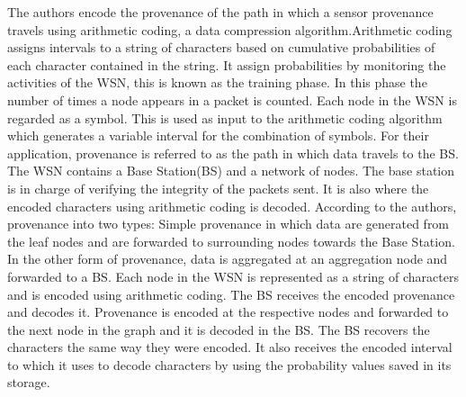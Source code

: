 The authors encode the provenance of the path in which a sensor provenance travels using arithmetic coding, a data compression algorithm.Arithmetic coding assigns intervals to a string of characters based on  cumulative probabilities of each character contained in the string. It assign probabilities by monitoring the activities of the WSN, this is known as the training phase. In this phase the number of times a node appears in a packet is counted.  Each node in the WSN is regarded as a symbol. This is used as input to the arithmetic coding algorithm which generates a variable interval for the combination of symbols. For their application, provenance is referred to as the path in which data travels to the BS. The WSN contains a Base Station(BS) and a network of nodes. The base station is in charge of verifying the integrity of the packets sent. It is also where the encoded characters using arithmetic coding is decoded.  According to the authors, provenance into two types: Simple provenance in which data are generated from the leaf nodes and are forwarded to surrounding nodes towards the Base Station. In the other form of provenance, data is aggregated at an aggregation node and forwarded to a BS. Each node in the WSN is represented as a string of characters and is encoded using arithmetic coding. The BS receives the encoded provenance and decodes it. Provenance is encoded at the respective nodes and forwarded to the next node in the graph and it is decoded in the BS. The BS recovers the characters the same way they were encoded. It also receives the encoded interval to which it uses to decode characters by using the probability values saved in its storage.



















